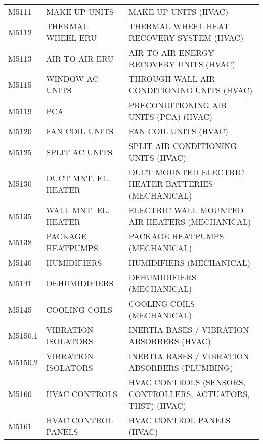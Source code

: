 \begin{longtable}[l]{l%
                  l|%
                  l|}
\rowcolor{thetableheadbgcolor!0.25!white} M5111       & MAKE UP UNITS   & MAKE UP UNITS (HVAC)   \\
\rowcolor{thetableheadbgcolor!0.25!white} M5112       & THERMAL WHEEL ERU   & THERMAL WHEEL HEAT RECOVERY SYSTEM (HVAC)   \\
\rowcolor{thetableheadbgcolor!0.25!white} M5113       & AIR TO AIR ERU   & AIR TO AIR ENERGY RECOVERY UNITS (HVAC)   \\
\rowcolor{thetableheadbgcolor!0.25!white} M5115       & WINDOW AC UNITS   & THROUGH WALL AIR CONDITIONING UNITS (HVAC)   \\
\rowcolor{thetableheadbgcolor!0.25!white} M5119       & PCA   & PRECONDITIONING AIR UNITS (PCA) (HVAC)   \\
\rowcolor{thetableheadbgcolor!0.25!white} M5120       & FAN COIL UNITS   & FAN COIL UNITS (HVAC)   \\
\rowcolor{thetableheadbgcolor!0.25!white} M5125       & SPLIT AC UNITS   & SPLIT AIR CONDITIONING UNITS (HVAC)   \\
\rowcolor{thetableheadbgcolor!0.25!white} M5130       & DUCT MNT. EL. HEATER   & DUCT MOUNTED ELECTRIC HEATER BATTERIES (MECHANICAL)   \\
\rowcolor{thetableheadbgcolor!0.25!white} M5135       & WALL MNT. EL. HEATER   & ELECTRIC WALL MOUNTED AIR HEATERS (MECHANICAL)   \\
\rowcolor{thetableheadbgcolor!0.25!white} M5138       & PACKAGE HEATPUMPS   & PACKAGE HEATPUMPS (MECHANICAL)   \\
\rowcolor{thetableheadbgcolor!0.25!white} M5140       & HUMIDIFIERS   & HUMIDIFIERS (MECHANICAL)   \\
\rowcolor{thetableheadbgcolor!0.25!white} M5141       & DEHUMIDIFIERS   & DEHUMIDIFIERS (MECHANICAL)   \\
\rowcolor{thetableheadbgcolor!0.25!white} M5145       & COOLING COILS   & COOLING COILS (MECHANICAL)   \\
\rowcolor{thetableheadbgcolor!0.25!white} M5150.1     & VIBRATION ISOLATORS   & INERTIA BASES / VIBRATION ABSORBERS (HVAC)   \\
\rowcolor{thetableheadbgcolor!0.25!white} M5150.2     & VIBRATION ISOLATORS   & INERTIA BASES / VIBRATION ABSORBERS (PLUMBING)   \\
\rowcolor{thetableheadbgcolor!0.25!white} M5160       & HVAC CONTROLS   & HVAC CONTROLS (SENSORS, CONTROLLERS, ACTUATORS, THST) (HVAC)   \\
\rowcolor{thetableheadbgcolor!0.25!white} M5161       & HVAC CONTROL PANELS   & HVAC CONTROL PANELS (HVAC)   \\

\end{longtable}
